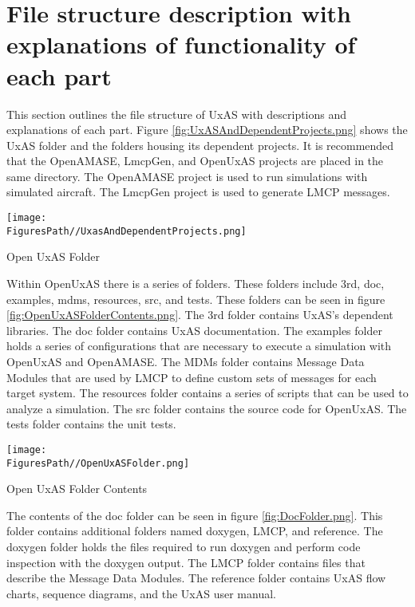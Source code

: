 \section{File structure description with explanations of functionality of each
	part}\label{FileStructureDescriptionWithExplanationsOfFunctionalityOfEachPart}

This section outlines the file structure of UxAS with descriptions and
explanations of each part. Figure \ref{fig:UxASAndDependentProjects.png} shows the
UxAS folder and the folders housing its dependent projects. It is
recommended that the OpenAMASE, LmcpGen, and OpenUxAS projects are
placed in the same directory. The OpenAMASE project is used to run
simulations with simulated aircraft. The LmcpGen project is used to
generate LMCP messages.

\begin{marginfigure}[150pt]
	\texttt{[image: \\FiguresPath//UxasAndDependentProjects.png]}
	\caption{Open UxAS Folder}
	\label{fig:UxASAndDependentProjects.png}
\end{marginfigure}

Within OpenUxAS there is a series of folders. These folders include 3rd,
doc, examples, mdms, resources, src, and tests. These folders can be
seen in figure \ref{fig:OpenUxASFolderContents.png}. The 3rd folder contains
UxAS's dependent libraries. The doc folder contains UxAS documentation.
The examples folder holds a series of configurations that are necessary
to execute a simulation with OpenUxAS and OpenAMASE. The MDMs folder
contains Message Data Modules that are used by LMCP to define custom
sets of messages for each target system. The resources folder contains a
series of scripts that can be used to analyze a simulation. The src
folder contains the source code for OpenUxAS. The tests folder contains
the unit tests.


\begin{marginfigure}[150pt]
	\texttt{[image: \\FiguresPath//OpenUxASFolder.png]}
	\caption{Open UxAS Folder Contents}
	\label{fig:OpenUxASFolderContents.png}
\end{marginfigure}

The contents of the doc folder can be seen in figure \ref{fig:DocFolder.png}.
This folder contains additional folders named doxygen, LMCP, and
reference. The doxygen folder holds the files required to run doxygen
and perform code inspection with the doxygen output. The LMCP folder
contains files that describe the Message Data Modules. The reference
folder contains UxAS flow charts, sequence diagrams, and the UxAS user
manual.

